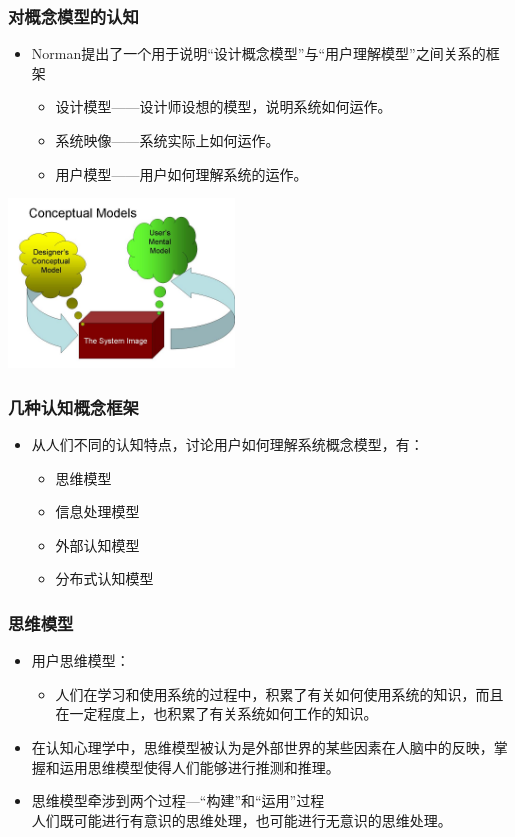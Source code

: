 \documentclass{beamer}
\begin{document}
\begin{frame}
	\frametitle{对概念模型的认知}
	\begin{itemize}
		\item Norman提出了一个用于说明“设计概念模型”与“用户理解模型”之间关系的框架~\cite{norman1988psychology}
		\begin{itemize}
			\item 设计模型——设计师设想的模型，说明系统如何运作。
			\item 系统映像——系统实际上如何运作。
			\item 用户模型——用户如何理解系统的运作。
		\end{itemize}
	\end{itemize}
	\begin{center}
		\includegraphics[width=6cm]{images/norman_model.jpg}
	\end{center}
\end{frame}

\begin{frame}
	\frametitle{几种认知概念框架}
	\begin{itemize}
		\item 从人们不同的认知特点，讨论用户如何理解系统概念模型，有：
		\begin{itemize}
			\item 思维模型
			\item 信息处理模型
			\item 外部认知模型
			\item 分布式认知模型
		\end{itemize}
	\end{itemize}
\end{frame}

\begin{frame}
	\frametitle{思维模型}
	\begin{itemize}
		\item 用户思维模型：
		\begin{itemize}
			\item 人们在学习和使用系统的过程中，积累了有关如何使用系统的知识，而且在一定程度上，也积累了有关系统如何工作的知识。
		\end{itemize}
		\item 在认知心理学中，思维模型被认为是外部世界的某些因素在人脑中的反映，掌握和运用思维模型使得人们能够进行推测和推理。
		\item 思维模型牵涉到两个过程—“构建”和“运用”过程\\{\tiny 人们既可能进行有意识的思维处理，也可能进行无意识的思维处理。}
	\end{itemize}
\end{frame}
\end{document}
